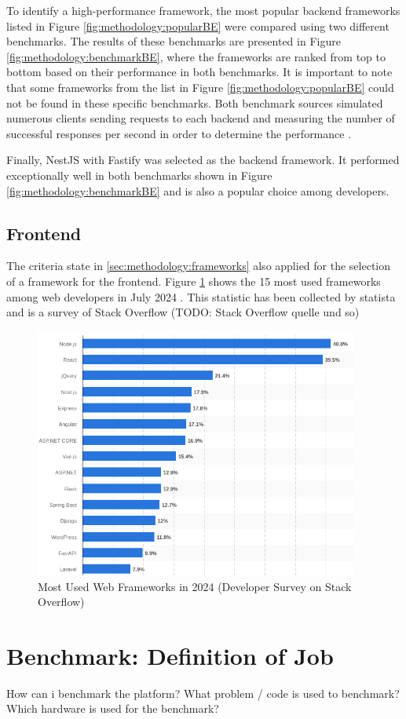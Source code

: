 To identify a high-performance framework, the most popular backend frameworks listed in Figure \ref{fig:methodology:popularBE} were compared using two different benchmarks. The results of these benchmarks are presented in Figure \ref{fig:methodology:benchmarkBE}, where the frameworks are ranked from top to bottom based on their performance in both benchmarks. It is important to note that some frameworks from the list in Figure \ref{fig:methodology:popularBE} could not be found in these specific benchmarks. Both benchmark sources simulated numerous clients sending requests to each backend and measuring the number of successful responses per second in order to determine the performance \cite{backend:benchmark1, backend:benchmark2}.

Finally, NestJS \cite{methodology:nestjs} with Fastify was selected as the backend framework. It performed exceptionally well in both benchmarks shown in Figure \ref{fig:methodology:benchmarkBE} and is also a popular choice among developers.

\subsection{Frontend}
\label{subsec:methodology:frameworks:frontend}
The criteria state in \ref{sec:methodology:frameworks} also applied for the selection of a framework for the frontend. Figure \ref{fig:methodology:popularFE} shows the 15 most used frameworks among web developers in July 2024 \cite{frontend:popularity}. This statistic has been collected by statista and is a survey of Stack Overflow (TODO: Stack Overflow quelle und so) 

\begin{figure}[htbp]
  \centering
  \includegraphics[width=0.95\textwidth]{gfx/figures/Top15_Frameworks_2024_Statista.png}
  \caption{Most Used Web Frameworks in 2024 (Developer Survey on Stack Overflow) \cite{frontend:popularity}}
  \label{fig:methodology:popularFE}
\end{figure}

\section{Benchmark: Definition of Job}
\label{sec:methodology:benchmark}
How can i benchmark the platform? What problem / code is used to benchmark? Which hardware is used for the benchmark?